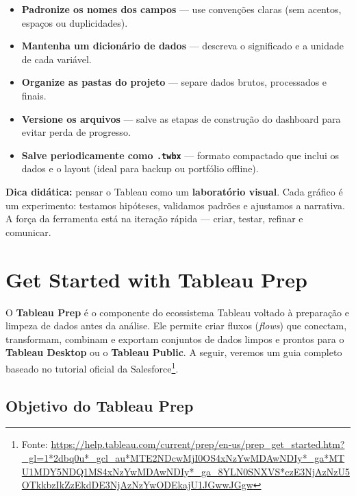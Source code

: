 \begin{itemize}[leftmargin=*]
  \item \textbf{Padronize os nomes dos campos} — use convenções claras (sem acentos, espaços ou duplicidades).  
  \item \textbf{Mantenha um dicionário de dados} — descreva o significado e a unidade de cada variável.  
  \item \textbf{Organize as pastas do projeto} — separe dados brutos, processados e finais.  
  \item \textbf{Versione os arquivos} — salve as etapas de construção do dashboard para evitar perda de progresso.  
  \item \textbf{Salve periodicamente como \texttt{.twbx}} — formato compactado que inclui os dados e o layout (ideal para backup ou portfólio offline).
\end{itemize}

\begin{NoteBox}
\textbf{Dica didática:} pensar o Tableau como um \textbf{laboratório visual}.  
Cada gráfico é um experimento: testamos hipóteses, validamos padrões e ajustamos a narrativa.  
A força da ferramenta está na iteração rápida — criar, testar, refinar e comunicar.
\end{NoteBox}



\section{Get Started with Tableau Prep}

O \textbf{Tableau Prep} é o componente do ecossistema Tableau voltado à preparação e limpeza de dados antes da análise.  
Ele permite criar fluxos (\textit{flows}) que conectam, transformam, combinam e exportam conjuntos de dados limpos e prontos para o \textbf{Tableau Desktop} ou o \textbf{Tableau Public}.  
A seguir, veremos um guia completo baseado no tutorial oficial da Salesforce\footnote{Fonte: \url{https://help.tableau.com/current/prep/en-us/prep_get_started.htm?_gl=1*2dbq0u*_gcl_au*MTE2NDcwMjI0OS4xNzYwMDAwNDIy*_ga*MTU1MDY5NDQ1MS4xNzYwMDAwNDIy*_ga_8YLN0SNXVS*czE3NjAzNzU5OTkkbzIkZzEkdDE3NjAzNzYwODEkajU1JGwwJGgw}}.

\subsection*{Objetivo do Tableau Prep}


